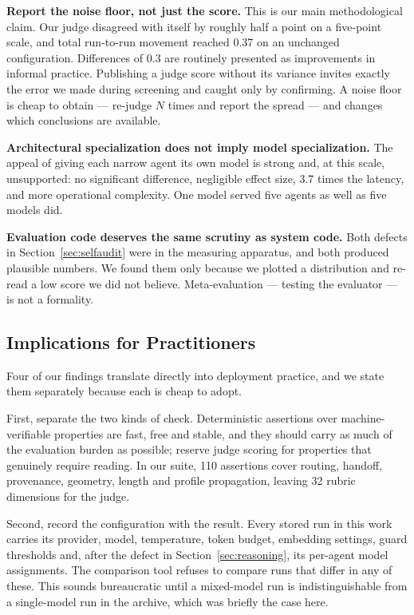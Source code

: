 \documentclass[journal]{IEEEtran}
\begin{document}
\textbf{Report the noise floor, not just the score.} This is our main
methodological claim. Our judge disagreed with itself by roughly half a point
on a five-point scale, and total run-to-run movement reached 0.37 on an
unchanged configuration. Differences of 0.3 are routinely presented as
improvements in informal practice. Publishing a judge score without its
variance invites exactly the error we made during screening and caught only by
confirming. A noise floor is cheap to obtain --- re-judge $N$ times and report
the spread --- and changes which conclusions are available.

\textbf{Architectural specialization does not imply model specialization.} The
appeal of giving each narrow agent its own model is strong and, at this scale,
unsupported: no significant difference, negligible effect size, 3.7 times the
latency, and more operational complexity. One model served five agents as well
as five models did.

\textbf{Evaluation code deserves the same scrutiny as system code.} Both
defects in Section~\ref{sec:selfaudit} were in the measuring apparatus, and both
produced plausible numbers. We found them only because we plotted a
distribution and re-read a low score we did not believe. Meta-evaluation ---
testing the evaluator --- is not a formality.

\subsection{Implications for Practitioners}
Four of our findings translate directly into deployment practice, and we state
them separately because each is cheap to adopt.

First, separate the two kinds of check. Deterministic assertions over
machine-verifiable properties are fast, free and stable, and they should carry
as much of the evaluation burden as possible; reserve judge scoring for
properties that genuinely require reading. In our suite, 110 assertions cover
routing, handoff, provenance, geometry, length and profile propagation, leaving
32 rubric dimensions for the judge.

Second, record the configuration with the result. Every stored run in this work
carries its provider, model, temperature, token budget, embedding settings,
guard thresholds and, after the defect in Section~\ref{sec:reasoning}, its
per-agent model assignments. The comparison tool refuses to compare runs that
differ in any of these. This sounds bureaucratic until a mixed-model run is
indistinguishable from a single-model run in the archive, which was briefly the
case here.
\end{document}

